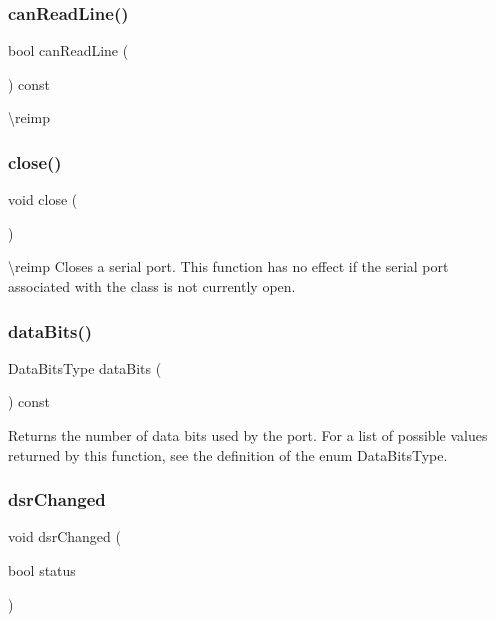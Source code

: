 \subsubsection{\texorpdfstring{canReadLine()}{canReadLine()}}
{\footnotesize\ttfamily bool can\+Read\+Line (\begin{DoxyParamCaption}{ }\end{DoxyParamCaption}) const}

\textbackslash{}reimp \mbox{\label{class_qext_serial_port_a5ae591df94fc66ccb85cbb6565368bca}} 
\subsubsection{\texorpdfstring{close()}{close()}}
{\footnotesize\ttfamily void close (\begin{DoxyParamCaption}{ }\end{DoxyParamCaption})}

\textbackslash{}reimp Closes a serial port. This function has no effect if the serial port associated with the class is not currently open. \mbox{\label{class_qext_serial_port_a8f1822355b63a38924d4f3c9e8b6ae8a}} 
\subsubsection{\texorpdfstring{dataBits()}{dataBits()}}
{\footnotesize\ttfamily Data\+Bits\+Type data\+Bits (\begin{DoxyParamCaption}{ }\end{DoxyParamCaption}) const}

Returns the number of data bits used by the port. For a list of possible values returned by this function, see the definition of the enum Data\+Bits\+Type. \mbox{\label{class_qext_serial_port_a6e3dbe614da07b32ad526428c0321c2e}} 
\subsubsection{\texorpdfstring{dsrChanged}{dsrChanged}}
{\footnotesize\ttfamily void dsr\+Changed (\begin{DoxyParamCaption}\item[{bool}]{status }\end{DoxyParamCaption})\hspace{0.3cm}{\ttfamily [signal]}}


